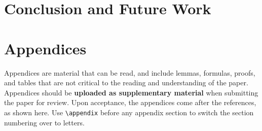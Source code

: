 \documentclass[11pt,a4paper]{article}
\begin{document}
\section{Conclusion and Future Work}






\appendix

\section{Appendices}
\label{sec:appendix}
Appendices are material that can be read, and include lemmas, formulas, proofs, and tables that are not critical to the reading and understanding of the paper. 
Appendices should be {\bf uploaded as supplementary material} when submitting the paper for review. Upon acceptance, the appendices come after the references, as shown here. Use
\verb|\appendix| before any appendix section to switch the section
numbering over to letters.
\end{document}
